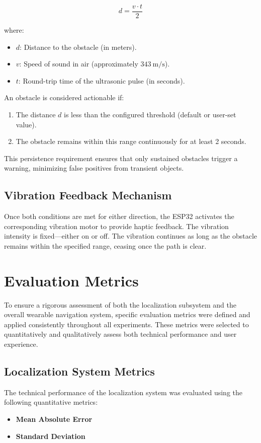 \[
d = \frac{v \cdot t}{2}
\]

where:
\begin{itemize}
	\item $d$: Distance to the obstacle (in meters).
	\item $v$: Speed of sound in air (approximately $343~\mathrm{m/s}$).
	\item $t$: Round-trip time of the ultrasonic pulse (in seconds).
\end{itemize}

An obstacle is considered actionable if:
\begin{enumerate}
	\item The distance $d$ is less than the configured threshold (default or user-set value).
	\item The obstacle remains within this range continuously for at least 2 seconds.
\end{enumerate}

This persistence requirement ensures that only sustained obstacles trigger a warning, minimizing false positives from transient objects.

\subsection{Vibration Feedback Mechanism}

Once both conditions are met for either direction, the ESP32 activates the corresponding vibration motor to provide haptic feedback. The vibration intensity is fixed—either on or off. The vibration continues as long as the obstacle remains within the specified range, ceasing once the path is clear.



\section{Evaluation Metrics}
\label{sec:evaluation_metrics}

To ensure a rigorous assessment of both the localization subsystem and the overall wearable navigation system, specific evaluation metrics were defined and applied consistently throughout all experiments. These metrics were selected to quantitatively and qualitatively assess both technical performance and user experience.

\subsection{Localization System Metrics}
The technical performance of the localization system was evaluated using the following quantitative metrics:
\begin{itemize}
	\item \textbf{Mean Absolute Error} 
	\item \textbf{Standard Deviation} 
\end{itemize}

